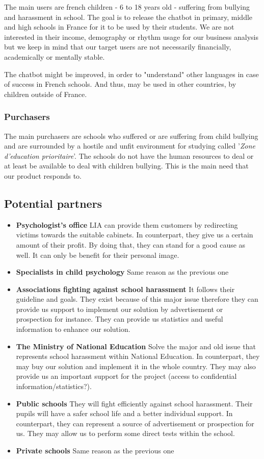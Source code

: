 \documentclass{article}
\begin{document}
The main users are french children - 6 to 18 years old - suffering from bullying and harassment in school. The goal is to release the chatbot in primary, middle and high schools in France for it to be used by their students. We are not interested in their income, demography or rhythm usage for our business analysis but we keep in mind that our target users are not necessarily financially, academically or mentally stable.

\medbreak

The chatbot might be improved, in order to "understand" other languages in case of success in French schools. And thus, may be used in other countries, by children outside of France.

\subsubsection{Purchasers}

The main purchasers are schools who suffered or are suffering from child bullying and are surrounded by a hostile and unfit environment for studying called '\textit{Zone d'education prioritaire}'. The schools do not have the human resources to deal or at least be available to deal with children bullying. This is the main need that our product responds to. 


\subsection{Potential partners}

\begin{itemize}
\item {\bf Psychologist's office} LIA can provide them customers by redirecting victims towards the suitable cabinets. In counterpart,
they give us a certain amount of their profit. By doing that, they can stand for a good cause as well. It
can only be benefit for their personal image.
\item {\bf Specialists in child psychology}
Same reason as the previous one
\item {\bf Associations fighting against school harassment}
It follows their guideline and goals. They exist because of this major issue therefore they can provide
us support to implement our solution by advertisement or prospection for instance. They can provide
us statistics and useful information to enhance our solution.
\item {\bf The Ministry of National Education}
Solve the major and old issue that represents school harassment within National Education. In
counterpart, they may buy our solution and implement it in the whole country. They may also
provide us an important support for the project (access to confidential information/statistics?).
\item {\bf Public schools}
They will fight efficiently against school harassment. Their pupils will have a safer school life and a
better individual support. In counterpart, they can represent a source of advertisement or
prospection for us. They may allow us to perform some direct tests within the school.
\item {\bf Private schools}
Same reason as the previous one
\end{itemize}
\end{document}
